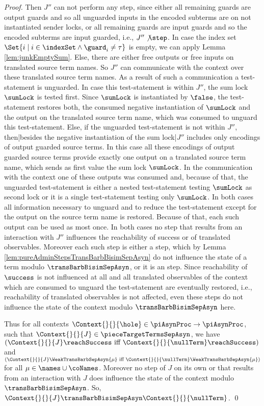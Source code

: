 \documentclass[]{llncs}
\begin{document}
\begin{proof}
	Then $ J'' $ can not perform any step, since either all remaining guards are output guards and so all unguarded inputs in the encoded subterms are on not instantiated sender locks, or all remaining guards are input guards and so the encoded subterms are input guarded, i.e., $ J'' \not\step $. In case the index set $ \Set{ i \mid i \in \indexSet \wedge \guard_i \neq \tau } $ is empty, we can apply Lemma \ref{lem:junkEmptySum}. Else, there are either free outputs or free inputs on translated source term names. So $ J'' $ can communicate with the context over these translated source term names. As a result of such a communication a test-statement is unguarded. In case this test-statement is within $ J'' $, the sum lock $ \sumLock $ is tested first. Since $ \sumLock $ is instantiated by $ \false $, the test-statement restores both, the consumed negative instantiation of $ \sumLock $ and the output on the translated source term name, which was consumed to unguard this test-statement. Else, if the unguarded test-statement is not within $ J'' $, then|besides the negative instantiation of the sum lock|$ J'' $ includes only encodings of output guarded source terms. In this case all these encodings of output guarded source terms provide exactly one output on a translated source term name, which sends as first value the sum lock $ \sumLock $. In the communication with the context one of these outputs was consumed and, because of that, the unguarded test-statement is either a nested test-statement testing $ \sumLock $ as second lock or it is a single test-statement testing only $ \sumLock $. In both cases all information necessary to unguard and to reduce the test-statement except for the output on the source term name is restored. Because of that, each such output can be used as most once. In both cases no step that results from an interaction with $ J'' $ influences the reachability of success or of translated observables. Moreover each such step is either a \pure \admin step, which by Lemma \ref{lem:pureAdminStepsTransBarbBisimSepAsyn} do not influence the state of a term modulo $ \transBarbBisimSepAsyn $, or it is an \impure \admin step. Since reachability of $ \success $ is not influenced at all and all translated observables of the context which are consumed to unguard the test-statement are eventually restored, i.e., reachability of translated observables is not affected, even these \impure \admin steps do not influence the state of the context modulo $ \transBarbBisimSepAsyn $ here.
	
	Thus for all contexts $ \Context{}{}{\hole} \in \piAsynProc \to \piAsynProc $, such that $ \Context{}{}{J} \in \pieceTargetTermsSepAsyn $, we have $ \left( \Context{}{}{J}\reachSuccess \text{ iff } \Context{}{}{\nullTerm}\reachSuccess \right) $ and $ \left( \Context{}{}{J}\WeakTransBarbSepAsyn{\mu} \text{ iff } \Context{}{}{\nullTerm}\WeakTransBarbSepAsyn{\mu} \right) $ for all $ \mu \in \names \cup \coNames $. Moreover no step of $ J $ on its own or that results from an interaction with $ J $ does influence the state of the context modulo $ \transBarbBisimSepAsyn $. So, $ \Context{}{}{J} \transBarbBisimSepAsyn \Context{}{}{\nullTerm} $.
	\qed
\end{proof}
\end{document}
